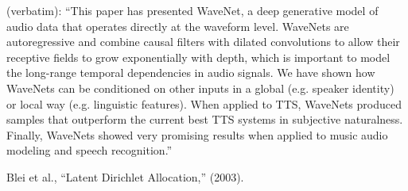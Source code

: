 \documentclass[11pt]{article}
\begin{document}
\myspace
\p {} (verbatim): ``This paper has presented WaveNet, a deep generative model of audio data that operates directly at the waveform level. WaveNets are autoregressive and combine causal filters with dilated convolutions to allow their receptive fields to grow exponentially with depth, which is important to model the long-range temporal dependencies in audio signals. We have shown how WaveNets can be conditioned
on other inputs in a global (e.g. speaker identity) or local way (e.g. linguistic features). When applied to TTS, WaveNets produced samples that outperform the current best TTS systems in subjective naturalness. Finally, WaveNets showed very promising results when applied to music audio modeling and speech recognition.''






\vspace{-1em}
{\footnotesize Blei et al., ``Latent Dirichlet Allocation,'' (2003).}
\end{document}
